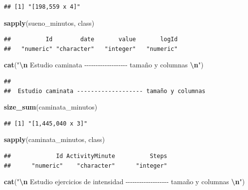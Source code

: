 \documentclass[
]{article}
\newenvironment{Shaded}{\begin{snugshade}}{\end{snugshade}}
\newcommand{\FunctionTok}[1]{\textcolor[rgb]{0.13,0.29,0.53}{\textbf{#1}}}
\newcommand{\NormalTok}[1]{#1}
\newcommand{\SpecialCharTok}[1]{\textcolor[rgb]{0.81,0.36,0.00}{\textbf{#1}}}
\newcommand{\StringTok}[1]{\textcolor[rgb]{0.31,0.60,0.02}{#1}}
\begin{document}
\begin{verbatim}
## [1] "[198,559 x 4]"
\end{verbatim}

\begin{Shaded}
\begin{Highlighting}[]
\FunctionTok{sapply}\NormalTok{(sueno\_minutos, class)}
\end{Highlighting}
\end{Shaded}

\begin{verbatim}
##          Id        date       value       logId 
##   "numeric" "character"   "integer"   "numeric"
\end{verbatim}

\begin{Shaded}
\begin{Highlighting}[]
\FunctionTok{cat}\NormalTok{(}\StringTok{"}\SpecialCharTok{\textbackslash{}n}\StringTok{ Estudio caminata {-}{-}{-}{-}{-}{-}{-}{-}{-}{-}{-}{-}{-}{-}{-}{-}{-}{-}{-} tamaño y columnas }\SpecialCharTok{\textbackslash{}n}\StringTok{"}\NormalTok{)}
\end{Highlighting}
\end{Shaded}

\begin{verbatim}
## 
##  Estudio caminata ------------------- tamaño y columnas
\end{verbatim}

\begin{Shaded}
\begin{Highlighting}[]
\FunctionTok{size\_sum}\NormalTok{(caminata\_minutos)}
\end{Highlighting}
\end{Shaded}

\begin{verbatim}
## [1] "[1,445,040 x 3]"
\end{verbatim}

\begin{Shaded}
\begin{Highlighting}[]
\FunctionTok{sapply}\NormalTok{(caminata\_minutos, class)}
\end{Highlighting}
\end{Shaded}

\begin{verbatim}
##             Id ActivityMinute          Steps 
##      "numeric"    "character"      "integer"
\end{verbatim}

\begin{Shaded}
\begin{Highlighting}[]
\FunctionTok{cat}\NormalTok{(}\StringTok{"}\SpecialCharTok{\textbackslash{}n}\StringTok{ Estudio ejercicios de intensidad {-}{-}{-}{-}{-}{-}{-}{-}{-}{-}{-}{-}{-}{-}{-}{-}{-}{-}{-} tamaño y columnas }\SpecialCharTok{\textbackslash{}n}\StringTok{"}\NormalTok{)}
\end{Highlighting}
\end{Shaded}
\end{document}
